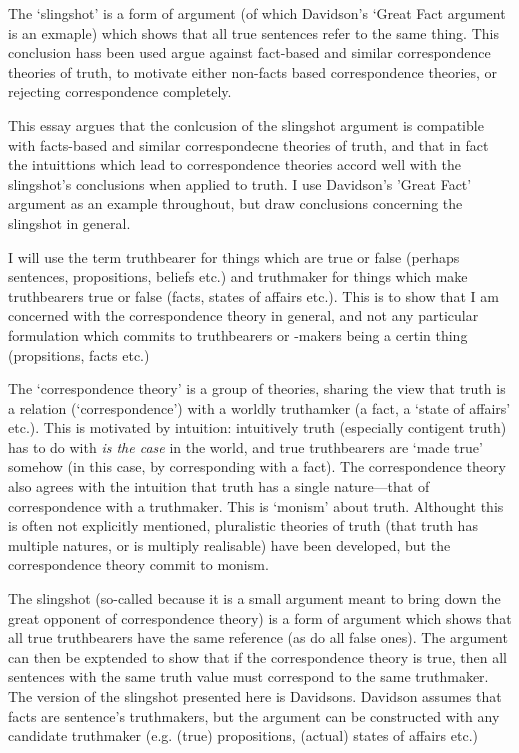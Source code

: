 The `slingshot' is a form of argument (of which Davidson's `Great Fact argument is an exmaple) which shows that all true sentences refer to the same thing.
This conclusion hass been used argue against fact-based and similar correspondence theories of truth, to motivate either non-facts based correspondence theories, or rejecting correspondence completely.

This essay argues that the conlcusion of the slingshot argument is compatible with facts-based and similar correspondecne theories of truth, and that in fact the intuittions which lead to correspondence theories accord well with the slingshot's conclusions when applied to truth.
I use Davidson's 'Great Fact' argument as an example throughout, but draw conclusions concerning the slingshot in general.

I will use the term truthbearer for things which are true or false (perhaps sentences, propositions, beliefs etc.) and truthmaker for things which make truthbearers true or false (facts, states of affairs etc.).
This is to show that I am concerned with the correspondence theory in general, and not any particular formulation which commits to truthbearers or -makers being a certin thing (propsitions, facts etc.)

The `correspondence theory' is a group of theories, sharing the view that truth is a relation (`correspondence') with a worldly truthamker (a fact, a `state of affairs' etc.).
This is motivated by intuition: intuitively truth  (especially contigent truth) has to do with \emph{is the case} in the world, and true truthbearers are `made true' somehow (in this case, by corresponding with a fact).
The correspondence theory also agrees with the intuition that truth has a single nature---that of correspondence with a truthmaker.
This is `monism' about truth.
Althought this is often not explicitly mentioned, pluralistic theories of truth (that truth has multiple natures, or is multiply realisable) have been developed, but the correspondence theory commit to monism.

The slingshot (so-called because it is a small argument meant to bring down the great opponent of correspondence theory) is a form of argument which shows that all true truthbearers have the same reference (as do all false ones).
The argument can then be exptended to show that if the correspondence theory is true, then all sentences with the same truth value must correspond to the same truthmaker.
The version of the slingshot presented here is Davidsons.
Davidson assumes that facts are sentence's truthmakers, but the argument can be constructed with any candidate truthmaker (e.g. (true) propositions, (actual) states of affairs etc.)
\parencite[752]{Davidson_1969} 

